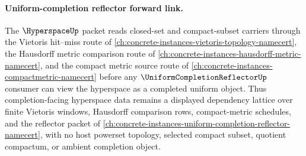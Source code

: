 \paragraph{Uniform-completion reflector forward link.}
The $\HyperspaceUp$ packet reads closed-set and compact-subset carriers through the Vietoris hit--miss route of \autoref{ch:concrete-instances-vietoris-topology-namecert}, the Hausdorff metric comparison route of \autoref{ch:concrete-instances-hausdorff-metric-namecert}, and the compact metric source route of \autoref{ch:concrete-instances-compactmetric-namecert} before any $\UniformCompletionReflectorUp$ consumer can view the hyperspace as a completed uniform object. Thus completion-facing hyperspace data remains a displayed dependency lattice over finite Vietoris windows, Hausdorff comparison rows, compact-metric schedules, and the reflector packet of \autoref{ch:concrete-instances-uniform-completion-reflector-namecert}, with no host powerset topology, selected compact subset, quotient compactum, or ambient completion object.
